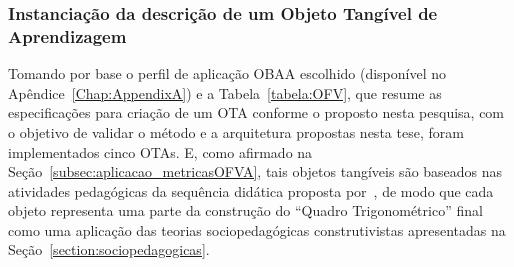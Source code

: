 \begin{table}[htb]
\begin{tabular}{|l|l|}
	\end{tabular}
	\label{tabela:OFV_estudo_caso1}
\end{table}

\subsubsection{Instanciação da descrição de um Objeto Tangível de Aprendizagem}\label{subsubsec:descricaoOFVA}
Tomando por base o perfil de aplicação OBAA escolhido (disponível no Apêndice~\ref{Chap:AppendixA}) e a Tabela~\ref{tabela:OFV}, que resume as especificações para criação de um OTA conforme o proposto nesta pesquisa, com o objetivo de validar o método e a arquitetura propostas nesta tese, foram implementados cinco OTAs. %
E, como afirmado na Seção~\ref{subsec:aplicacao_metricasOFVA}, tais objetos tangíveis são baseados nas atividades pedagógicas da sequência didática proposta por~\cite{silva:2011}, de modo que cada objeto representa uma parte da construção do ``Quadro Trigonométrico'' final como uma aplicação das teorias sociopedagógicas construtivistas apresentadas na Seção~\ref{section:sociopedagogicas}.

